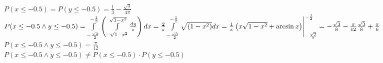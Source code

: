 \documentclass{article}
\begin{document}
	\begin{center}
		$P(x\leq -0.5) = P(y\leq -0.5) = \frac{1}{3} - \frac{\sqrt{3}}{4\pi}\quad $\\
		
		$P(x \leq -0.5 \wedge y \leq -0.5)  = \int\limits_{-\frac{\sqrt{3}}{2}}^{-\frac{1}{2}} \left( \int\limits\limits_{-\sqrt{1-x^2}}^{\sqrt{1-x^2}} \frac{dy}{\pi} \right)dx
		= \frac{2}{\pi}\int\limits_{-\frac{\sqrt{3}}{2}}^{-\frac{1}{2}} \sqrt{(1-x^2)}dx
		= \frac{1}{\pi}\left( x\sqrt{1-x^2} + \arcsin x \right) \Biggr|_{-\frac{\sqrt{3}}{2}}^{-\frac{1}{2}} = - \frac{\sqrt{3}}{8} - \frac{\pi}{12}\frac{\sqrt{3}}{8} + \frac{\pi}{6}$ \\
		$P(x \leq -0.5 \wedge y \leq -0.5)  =  \frac{\pi}{12}$\\
		
		$P(x \leq -0.5 \wedge y \leq -0.5) \not = P(x\leq -0.5) \cdot P(y\leq -0.5)$
	\end{center}
	
	
\end{document}
